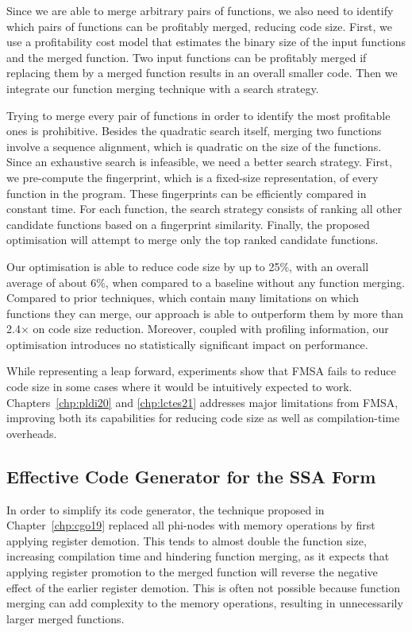 Since we are able to merge arbitrary pairs of functions, we also need to identify which pairs of functions can be profitably merged, reducing code size.
First, we use a profitability cost model that estimates the binary size of the input functions and the merged function.
Two input functions can be profitably merged if replacing them by a merged function results in an overall smaller code.
Then we integrate our function merging technique with a search strategy.

Trying to merge every pair of functions in order to identify the most profitable ones is prohibitive.
Besides the quadratic search itself, merging two functions involve a sequence alignment, which is quadratic on the size of the functions.
Since an exhaustive search is infeasible, we need a better search strategy.
First, we pre-compute the fingerprint, which is a fixed-size representation, of every function in the program.
These fingerprints can be efficiently compared in constant time.
For each function, the search strategy consists of ranking all other candidate functions based on a fingerprint similarity.
Finally, the proposed optimisation will attempt to merge only the top ranked candidate functions.

Our optimisation is able to reduce code size by up to 25\%, with an overall average of about 6\%, when compared to a baseline without any function merging.
Compared to prior techniques, which contain many limitations on which functions they can merge, our approach is able to outperform them by more than 2.4$\times$ on code size reduction.
Moreover, coupled with profiling information, our optimisation introduces no statistically significant impact on performance.

While representing a leap forward, experiments show that FMSA fails to reduce code size in some cases where it would be intuitively expected to work. Chapters~\ref{chp:pldi20} and \ref{chp:lctes21} addresses major limitations from FMSA, improving both its capabilities for reducing code size as well as compilation-time overheads.

\subsection{Effective Code Generator for the SSA Form}

In order to simplify its code generator, the technique proposed in Chapter~\ref{chp:cgo19} replaced all phi-nodes with memory operations by first applying register demotion.
This tends to almost double the function size, increasing compilation time and hindering function merging, as it expects that applying register promotion to the merged function will reverse the negative effect of the earlier register demotion.
This is often not possible because function merging can add complexity to the memory operations, resulting in unnecessarily larger merged functions.

